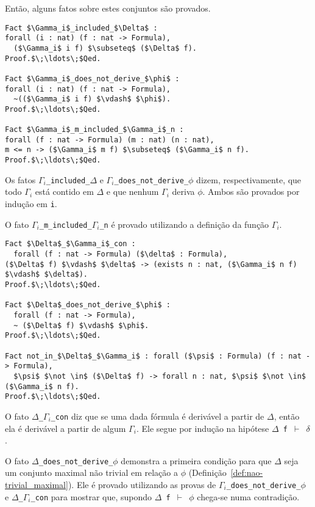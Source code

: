         Então, alguns fatos sobre estes conjuntos são provados.

        \begin{lstlisting}[name=Completeness, frame=single, language=coq]
Fact $\Gamma_i$_included_$\Delta$ : 
forall (i : nat) (f : nat -> Formula),
  ($\Gamma_i$ i f) $\subseteq$ ($\Delta$ f).
Proof.$\;\ldots\;$Qed.

Fact $\Gamma_i$_does_not_derive_$\phi$ :
forall (i : nat) (f : nat -> Formula),
  ~(($\Gamma_i$ i f) $\vdash$ $\phi$).
Proof.$\;\ldots\;$Qed.

Fact $\Gamma_i$_m_included_$\Gamma_i$_n : 
forall (f : nat -> Formula) (m : nat) (n : nat), 
m <= n -> ($\Gamma_i$ m f) $\subseteq$ ($\Gamma_i$ n f).
Proof.$\;\ldots\;$Qed.
        \end{lstlisting}

        Os fatos \texttt{$\Gamma_i$\_included\_$\Delta$} e \texttt{$\Gamma_i$\_does\_not\_derive\_$\phi$} dizem, respectivamente, que todo $\Gamma_i$ está contido em $\Delta$ e que nenhum $\Gamma_i$ deriva $\phi$. Ambos são provados por indução em \texttt{i}. 
        
        O fato \texttt{$\Gamma_i$\_m\_included\_$\Gamma_i$\_n} é provado utilizando a definição da função \texttt{$\Gamma_i$}.

        \begin{lstlisting}[name=Completeness, frame=single, language=coq]
Fact $\Delta$_$\Gamma_i$_con :
  forall (f : nat -> Formula) ($\delta$ : Formula), 
($\Delta$ f) $\vdash$ $\delta$ -> (exists n : nat, ($\Gamma_i$ n f) $\vdash$ $\delta$).
Proof.$\;\ldots\;$Qed.

Fact $\Delta$_does_not_derive_$\phi$ : 
  forall (f : nat -> Formula), 
  ~ ($\Delta$ f) $\vdash$ $\phi$.
Proof.$\;\ldots\;$Qed.

Fact not_in_$\Delta$_$\Gamma_i$ : forall ($\psi$ : Formula) (f : nat -> Formula),
  $\psi$ $\not \in$ ($\Delta$ f) -> forall n : nat, $\psi$ $\not \in$ ($\Gamma_i$ n f).
Proof.$\;\ldots\;$Qed.
        \end{lstlisting}
        
        O fato \texttt{$\Delta$\_$\Gamma_i$\_con} diz que se uma dada fórmula é derivável a partir de $\Delta$, então ela é derivável a partir de algum $\Gamma_i$. Ele segue por indução na hipótese \texttt{$\Delta$ f $\vdash$ $\delta$}. 
        
        O fato \texttt{$\Delta$\_does\_not\_derive\_$\phi$} demonstra a primeira condição para que $\Delta$ seja um conjunto maximal não trivial em relação a $\phi$ (Definição~\ref{def:nao-trivial_maximal}). Ele é provado utilizando as provas de \texttt{$\Gamma_i$\_does\_not\_derive\_$\phi$} e \texttt{$\Delta$\_$\Gamma_i$\_con} para mostrar que, supondo \texttt{$\Delta$ f $\vdash$ $\phi$} chega-se numa contradição. 
        
